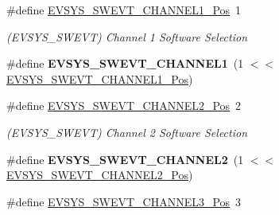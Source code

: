 \begin{DoxyCompactItemize}
\item 
\hypertarget{group___s_a_m_l21___e_v_s_y_s_ga99eae07b98fdc3b6ce69f85c66bd6c19}{}\#define \hyperlink{group___s_a_m_l21___e_v_s_y_s_ga99eae07b98fdc3b6ce69f85c66bd6c19}{E\+V\+S\+Y\+S\+\_\+\+S\+W\+E\+V\+T\+\_\+\+C\+H\+A\+N\+N\+E\+L1\+\_\+\+Pos}~1\label{group___s_a_m_l21___e_v_s_y_s_ga99eae07b98fdc3b6ce69f85c66bd6c19}

\begin{DoxyCompactList}\small\item\em (E\+V\+S\+Y\+S\+\_\+\+S\+W\+E\+V\+T) Channel 1 Software Selection \end{DoxyCompactList}\item 
\hypertarget{group___s_a_m_l21___e_v_s_y_s_gaae5e2320e06c7f0e083df0e0763516c8}{}\#define {\bfseries E\+V\+S\+Y\+S\+\_\+\+S\+W\+E\+V\+T\+\_\+\+C\+H\+A\+N\+N\+E\+L1}~(1 $<$$<$ \hyperlink{group___s_a_m_l21___e_v_s_y_s_ga99eae07b98fdc3b6ce69f85c66bd6c19}{E\+V\+S\+Y\+S\+\_\+\+S\+W\+E\+V\+T\+\_\+\+C\+H\+A\+N\+N\+E\+L1\+\_\+\+Pos})\label{group___s_a_m_l21___e_v_s_y_s_gaae5e2320e06c7f0e083df0e0763516c8}

\item 
\hypertarget{group___s_a_m_l21___e_v_s_y_s_ga324b1a957add8ed5df1080df90e43c19}{}\#define \hyperlink{group___s_a_m_l21___e_v_s_y_s_ga324b1a957add8ed5df1080df90e43c19}{E\+V\+S\+Y\+S\+\_\+\+S\+W\+E\+V\+T\+\_\+\+C\+H\+A\+N\+N\+E\+L2\+\_\+\+Pos}~2\label{group___s_a_m_l21___e_v_s_y_s_ga324b1a957add8ed5df1080df90e43c19}

\begin{DoxyCompactList}\small\item\em (E\+V\+S\+Y\+S\+\_\+\+S\+W\+E\+V\+T) Channel 2 Software Selection \end{DoxyCompactList}\item 
\hypertarget{group___s_a_m_l21___e_v_s_y_s_gab0ee2e9655272787c88bea88bb9091d7}{}\#define {\bfseries E\+V\+S\+Y\+S\+\_\+\+S\+W\+E\+V\+T\+\_\+\+C\+H\+A\+N\+N\+E\+L2}~(1 $<$$<$ \hyperlink{group___s_a_m_l21___e_v_s_y_s_ga324b1a957add8ed5df1080df90e43c19}{E\+V\+S\+Y\+S\+\_\+\+S\+W\+E\+V\+T\+\_\+\+C\+H\+A\+N\+N\+E\+L2\+\_\+\+Pos})\label{group___s_a_m_l21___e_v_s_y_s_gab0ee2e9655272787c88bea88bb9091d7}

\item 
\hypertarget{group___s_a_m_l21___e_v_s_y_s_ga8e3359be2580cdae8c60963148ec2a81}{}\#define \hyperlink{group___s_a_m_l21___e_v_s_y_s_ga8e3359be2580cdae8c60963148ec2a81}{E\+V\+S\+Y\+S\+\_\+\+S\+W\+E\+V\+T\+\_\+\+C\+H\+A\+N\+N\+E\+L3\+\_\+\+Pos}~3\label{group___s_a_m_l21___e_v_s_y_s_ga8e3359be2580cdae8c60963148ec2a81}


\end{DoxyCompactItemize}

